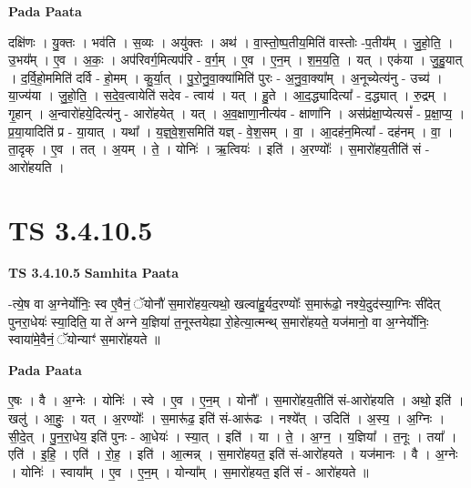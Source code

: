 \documentclass[17pt]{extarticle}
\begin{document}
\textbf{Pada Paata} \newline

दक्षि॑णः । यु॒क्तः । भव॑ति । स॒व्यः । अयु॑क्तः । अथ॑ । वा॒स्तो॒ष्प॒तीय॒मिति॑ वास्तोः -प॒तीय᳚म् । जु॒हो॒ति॒ । उ॒भय᳚म् । ए॒व । अ॒कः॒ । अप॑रिवर्ग॒मित्यप॑रि - व॒र्ग॒म् । ए॒व । ए॒न॒म् । श॒म॒य॒ति॒ । यत् । एक॑या । जु॒हु॒यात् । द॒र्वि॒हो॒ममिति॑ दर्वि - हो॒मम् । कु॒र्या॒त् । पु॒रो॒नु॒वा॒क्या॑मिति॑ पुरः - अ॒नु॒वा॒क्या᳚म् । अ॒नूच्येत्य॑नु - उच्य॑ । या॒ज्य॑या । जु॒हो॒ति॒ । स॒दे॒व॒त्वायेति॑ सदेव - त्वाय॑ । यत् । हु॒ते । आ॒द॒द्ध्यादित्या᳚ - द॒द्ध्यात् । रु॒द्रम् । गृ॒हान् । अ॒न्वारो॑हये॒दित्य॑नु - आरो॑हयेत् । यत् । अ॒व॒क्षाणा॒नीत्य॑व - क्षाणा॑नि । अस॑प्रंक्षा॒प्येत्यसं᳚ - प्र॒क्षा॒प्य॒ । प्र॒या॒यादिति॑ प्र - या॒यात् । यथा᳚ । य॒ज्ञ्॒वे॒श॒समिति॑ यज्ञ् - वे॒श॒सम् । वा॒ । आ॒दह॑न॒मित्या᳚ - दह॑नम् । वा॒ । ता॒दृक् । ए॒व । तत् । अ॒यम् । ते॒ । योनिः॑ । ऋ॒त्वियः॑ । इति॑ । अ॒रण्योः᳚ । स॒मारो॑हय॒तीति॑ सं - आरो॑हयति ।  \newline




\section*{ TS 3.4.10.5 }

\textbf{TS 3.4.10.5 } \newline
\textbf{Samhita Paata} \newline

-त्ये॒ष वा अ॒ग्नेर्योनिः॒ स्व ए॒वैनं॒ ॅयोनौ॑ स॒मारो॑हय॒त्यथो॒ खल्वा॑हु॒र्यद॒रण्योः᳚ स॒मारू॑ढो॒ नश्ये॒दुद॑स्या॒ग्निः सी॑देत् पुनरा॒धेयः॑ स्या॒दिति॒ या ते॑ अग्ने य॒ज्ञिया॑ त॒नूस्तयेह्या रो॒हेत्या॒त्मन्थ् स॒मारो॑हयते॒ यज॑मानो॒ वा अ॒ग्नेर्योनिः॒ स्वाया॑मे॒वैनं॒ ॅयोन्याꣳ॑ स॒मारो॑हयते ॥ \newline

\textbf{Pada Paata} \newline

ए॒षः । वै । अ॒ग्नेः । योनिः॑ । स्वे । ए॒व । ए॒न॒म् । योनौ᳚ । स॒मारो॑हय॒तीति॑ सं-आरो॑हयति । अथो॒ इति॑ । खलु॑ । आ॒हुः॒ । यत् । अ॒रण्योः᳚ । स॒मारू॑ढ॒ इति॑ सं-आरू॑ढः । नश्ये᳚त् । उदिति॑ । अ॒स्य॒ । अ॒ग्निः । सी॒दे॒त् । पु॒न॒रा॒धेय॒ इति॑ पुनः - आ॒धेयः॑ । स्या॒त् । इति॑ । या । ते॒ । अ॒ग्न॒ । य॒ज्ञिया᳚ । त॒नूः । तया᳚ । एति॑ । इ॒हि॒ । एति॑ । रो॒ह॒ । इति॑ । आ॒त्मन्न् । स॒मारो॑हयत॒ इति॑ सं-आरो॑हयते । यज॑मानः । वै । अ॒ग्नेः । योनिः॑ । स्वाया᳚म् । ए॒व । ए॒न॒म् । योन्या᳚म् । स॒मारो॑हयत॒ इति॑ सं - आरो॑हयते ॥  \newline
\end{document}

